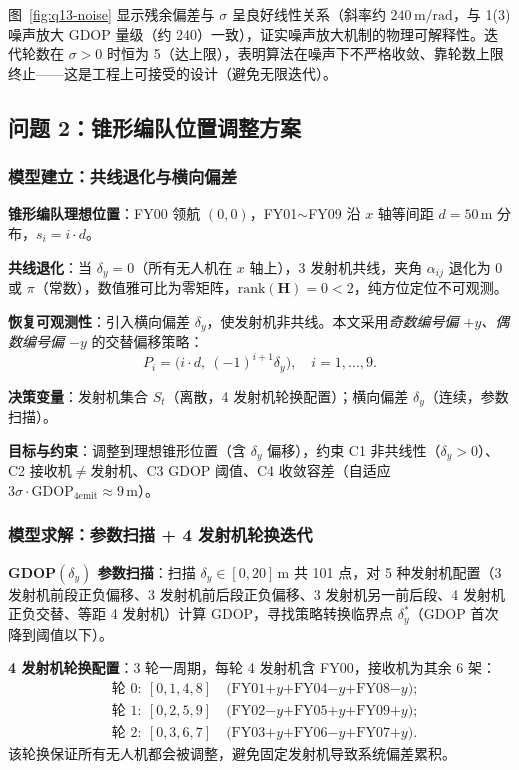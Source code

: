 \documentclass[12pt,a4paper]{ctexart}
\newcommand{\unit}[1]{\ensuremath{\,\mathrm{#1}}}
\newcommand{\figref}[1]{图~\ref{#1}}
\begin{document}
\figref{fig:q13-noise} 显示残余偏差与 $\sigma$ 呈良好线性关系（斜率约 $240\unit{m/rad}$，与 1(3) 噪声放大 GDOP 量级（约 240）一致），证实噪声放大机制的物理可解释性。迭代轮数在 $\sigma>0$ 时恒为 5（达上限），表明算法在噪声下不严格收敛、靠轮数上限终止——这是工程上可接受的设计（避免无限迭代）。

\subsection{问题 2：锥形编队位置调整方案}

\subsubsection{模型建立：共线退化与横向偏差}

\textbf{锥形编队理想位置}：FY00 领航 $(0,0)$，FY01$\sim$FY09 沿 $x$ 轴等间距 $d=50\unit{m}$ 分布，$s_i=i\cdot d$。

\textbf{共线退化}：当 $\delta_y=0$（所有无人机在 $x$ 轴上），3 发射机共线，夹角 $\alpha_{ij}$ 退化为 $0$ 或 $\pi$（常数），数值雅可比为零矩阵，$\text{rank}(\mathbf{H})=0<2$，纯方位定位不可观测。

\textbf{恢复可观测性}：引入横向偏差 $\delta_y$，使发射机非共线。本文采用\emph{奇数编号偏 $+y$、偶数编号偏 $-y$} 的交替偏移策略：
\begin{equation}
P_i=\bigl(i\cdot d,\ (-1)^{i+1}\delta_y\bigr),\quad i=1,\dots,9.
\label{eq:q2-offset}
\end{equation}

\textbf{决策变量}：发射机集合 $S_t$（离散，4 发射机轮换配置）；横向偏差 $\delta_y$（连续，参数扫描）。

\textbf{目标与约束}：调整到理想锥形位置（含 $\delta_y$ 偏移），约束 C1 非共线性（$\delta_y>0$）、C2 接收机$\neq$发射机、C3 GDOP 阈值、C4 收敛容差（自适应 $3\sigma\cdot\text{GDOP}_{4\text{emit}}\approx 9\unit{m}$）。

\subsubsection{模型求解：参数扫描 + 4 发射机轮换迭代}

\textbf{GDOP$(\delta_y)$ 参数扫描}：扫描 $\delta_y\in[0,20]\unit{m}$ 共 101 点，对 5 种发射机配置（3 发射机前段正负偏移、3 发射机前后段正负偏移、3 发射机另一前后段、4 发射机正负交替、等距 4 发射机）计算 GDOP，寻找策略转换临界点 $\delta_y^*$（GDOP 首次降到阈值以下）。

\textbf{4 发射机轮换配置}：3 轮一周期，每轮 4 发射机含 FY00，接收机为其余 6 架：
\begin{equation*}
\begin{aligned}
&\text{轮 0}:\ [0,1,4,8]\quad\text{(FY01$+y$+FY04$-y$+FY08$-y$)};\\
&\text{轮 1}:\ [0,2,5,9]\quad\text{(FY02$-y$+FY05$+y$+FY09$+y$)};\\
&\text{轮 2}:\ [0,3,6,7]\quad\text{(FY03$+y$+FY06$-y$+FY07$+y$)}.
\end{aligned}
\end{equation*}
该轮换保证所有无人机都会被调整，避免固定发射机导致系统偏差累积。
\end{document}
